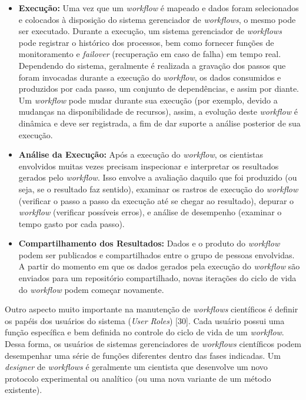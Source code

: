 \begin{itemize}
    \item \textbf{Execução:} Uma vez que um \textit{workflow} é mapeado e dados foram selecionados e colocados à disposição do sistema gerenciador de \textit{workflows}, o mesmo pode ser executado. Durante a execução, um sistema gerenciador de \textit{workflows} pode registrar o histórico dos processos, bem como fornecer funções de monitoramento e \textit{failover} (recuperação em caso de falha) em tempo real. Dependendo do sistema, geralmente é realizada a gravação dos passos que foram invocadas durante a execução do \textit{workflow}, os dados consumidos e produzidos por cada passo, um conjunto de dependências, e assim por diante. Um \textit{workflow} pode mudar durante sua execução (por exemplo, devido a mudanças na disponibilidade de recursos), assim, a evolução deste \textit{workflow} é dinâmica e deve ser registrada, a fim de dar suporte a análise posterior de sua execução.
    \item \textbf{Análise da Execução:} Após a execução do \textit{workflow}, os cientistas envolvidos muitas vezes precisam inspecionar e interpretar os resultados gerados pelo \textit{workflow}. Isso envolve a avaliação daquilo que foi produzido (ou seja, se o resultado faz sentido), examinar os rastros de execução do \textit{workflow} (verificar o passo a passo da execução até se chegar ao resultado), depurar o \textit{workflow} (verificar possíveis erros), e análise de desempenho (examinar o tempo gasto por cada passo).
    \item \textbf{Compartilhamento dos Resultados:} Dados e o produto do \textit{workflow} podem ser publicados e compartilhados entre o grupo de pessoas envolvidas. A partir do momento em que os dados gerados pela execução do \textit{workflow} são enviados para um repositório compartilhado, novas iterações do ciclo de vida do \textit{workflow} podem começar novamente.
\end{itemize}    
    
Outro aspecto muito importante na manutenção de \textit{workflows} científicos é definir os papéis dos usuários do sistema (\textit{User Roles}) [30]. Cada usuário possui uma função específica e bem definida no controle do ciclo de vida de um \textit{workflow}. Dessa forma, os usuários de sistemas gerenciadores de \textit{workflows} científicos podem desempenhar uma série de funções diferentes dentro das fases indicadas. Um \textit{designer} de \textit{workflows} é geralmente um cientista que desenvolve um novo protocolo experimental ou analítico (ou uma nova variante de um método existente). 

